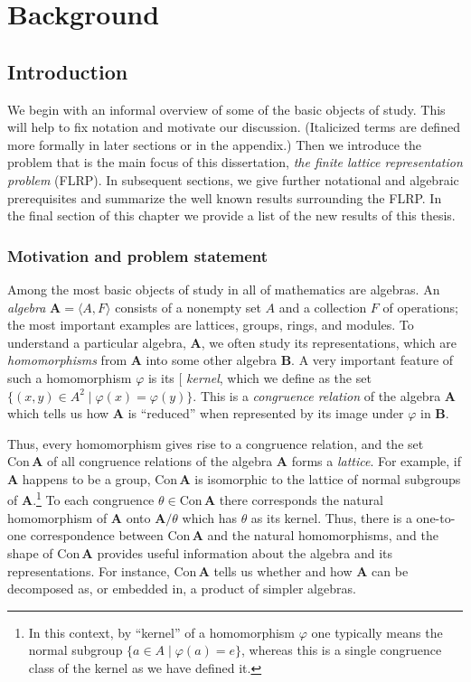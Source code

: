 \documentclass[cm,dissertation]{uhthesis}
\theoremstyle{plain}
\theoremstyle{definition}
\theoremstyle{remark}
\numberwithin{theorem}{section}
\numberwithin{claim}{chapter}
\numberwithin{equation}{section}
\numberwithin{conjecture}{chapter}
\newcommand{\<}{\ensuremath{\langle}}
\renewcommand{\>}{\ensuremath{\rangle}}
\newcommand{\Con}{\ensuremath{\mathrm{Con\,}}}
\newcommand{\FLRP}{{\small FLRP}}
\newcommand{\0}{\ensuremath{\mathbf{0}}}
\newcommand{\1}{\ensuremath{\mathbf{1}}}
\newcommand{\2}{\ensuremath{\mathbf{2}}}
\newcommand{\3}{\ensuremath{\mathbf{3}}}
\newcommand{\4}{\ensuremath{\mathbf{4}}}
\newcommand{\5}{\ensuremath{\mathbf{5}}}
\newcommand{\bA}{\ensuremath{\mathbf{A}}}
\newcommand{\bB}{\ensuremath{\mathbf{B}}}
\newcommand{\indexit}[1]{\index{#1|textit}}
\def\defn#1{\gdef\defnstring{#1}%
  \xdef\dodefnii{{\noexpand\em
       \defnstring}\noexpand\indexit{\defnstring}\noexpand\makeatother}%
  \futurelet\nextthing\dodefn}
\def\dodefn{%
  \ifx\nextthing[\let\next=\dodefni
    \else\let\next=\dodefnii\fi
  \makeatletter
  \next}
\def\dodefni[#1]{%
  {\em\defnstring}%
  \indexit{#1}%
  \makeatother}
\begin{document}
\part{Background}

\chapter{Introduction}
\label{cha:introduction}

We begin with an informal overview of some of the basic objects
of study.
This will help to fix notation and motivate our discussion.
(Italicized terms are defined more formally in later sections or
in the appendix.)  Then we 
introduce the problem that is the main focus of this
%
dissertation, \emph{the finite lattice representation problem} (\FLRP).  
In subsequent sections, we give further
notational and algebraic prerequisites and summarize the well known results
surrounding the FLRP.  In the final section of this chapter we provide a list of
the new results of this thesis.

\section{Motivation and problem statement}
Among the most basic objects of study in all of mathematics are algebras.
An 
%
\emph{algebra} 
$\bA = \<A, F\>$ consists of a nonempty set $A$ and a
collection $F$ of operations;  
the most important examples are lattices, groups, rings, and modules.  To
understand a particular algebra, $\bA$, we often study its representations,
which are 
\emph{homomorphisms} from $\bA$ into some other algebra $\bB$.
A very important feature of such a homomorphism $\varphi$ is its 
\defn{kernel}, 
which we define as the set $\{(x,y)\in A^2 \mid \varphi(x) = \varphi(y)\}$.
This is a 
%
\emph{congruence relation}
 of the algebra $\bA$ which tells us how
$\bA$ is ``reduced'' when represented by its image under $\varphi$ in $\bB$.   

Thus, every homomorphism gives rise to a congruence relation, and the set 
$\Con \bA$ of all congruence relations of the algebra $\bA$ forms a 
%
\emph{lattice}.  
For example, if $\bA$ happens to be a group, $\Con \bA$ is isomorphic
to the lattice of normal subgroups  of $\bA$.\footnote{In this context, by
  ``kernel'' of a homomorphism $\varphi$ one typically means the normal subgroup
  $\{a \in A \mid \varphi(a) = e\}$, whereas 
  this is a single  congruence class of the kernel as we have defined it.}
To each congruence $\theta \in \Con \bA$ there corresponds the natural
homomorphism of $\bA$ onto $\bA/\theta$ which has $\theta$ as its kernel.   
Thus, there is a one-to-one correspondence between
$\Con\bA$ and the natural homomorphisms, and the shape of $\Con\bA$
provides useful information about the algebra and its representations.  
For instance, $\Con \bA$ tells us whether and how $\bA$ can be decomposed as, or
embedded in, a product of simpler algebras. 
\end{document}
